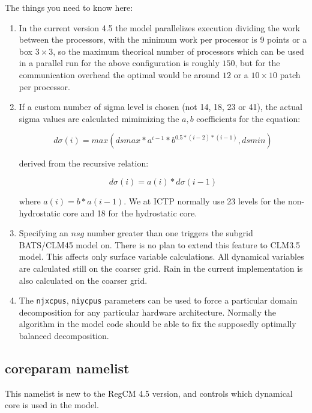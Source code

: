 The things you need to know here:

\begin{enumerate}
\item In the current version 4.5 the model parallelizes execution dividing
the work between the processors, with the minimum work per processor is 9
points or a box $3\times3$, so the maximum theorical number of processors which
can be used in a parallel run for the above configuration is roughly $150$,
but for the communication overhead the optimal would be around $12$ or a
$10\times10$ patch per processor.
\item If a custom number of sigma level is chosen (not 14, 18, 23 or 41), the
actual sigma values are calculated mimimizing the $a,b$ coefficients for the 
equation:

\begin{equation}
	d\sigma(i) = max(dsmax*a^{i-1}*b^{0.5*(i-2)*(i-1)},dsmin)
\end{equation}

derived from the recursive relation:

\begin{equation}
  d\sigma(i) = a(i)*d\sigma(i-1)
\end{equation}

where $a(i) = b*a(i-1)$. We at ICTP normally use 23 levels for the
non-hydrostatic core and 18 for the hydrostatic core.
\item Specifying an $nsg$ number greater than one triggers the subgrid
BATS/CLM45 model on. There is no plan to extend this feature to CLM3.5 model.
This affects only surface variable calculations. All dynamical
variables are calculated still on the coarser grid.
Rain in the current implementation is also calculated on the coarser
grid.
\item The \verb=njxcpus=, \verb=niycpus= parameters can be used to force
a particular domain decomposition for any particular hardware architecture.
Normally the algorithm in the model code should be able to fix the
supposedly optimally balanced decomposition.
\end{enumerate}

\subsection{coreparam namelist}
\label{coreparam}

This namelist is new to the RegCM 4.5 version, and controls which dynamical
core is used in the model.

